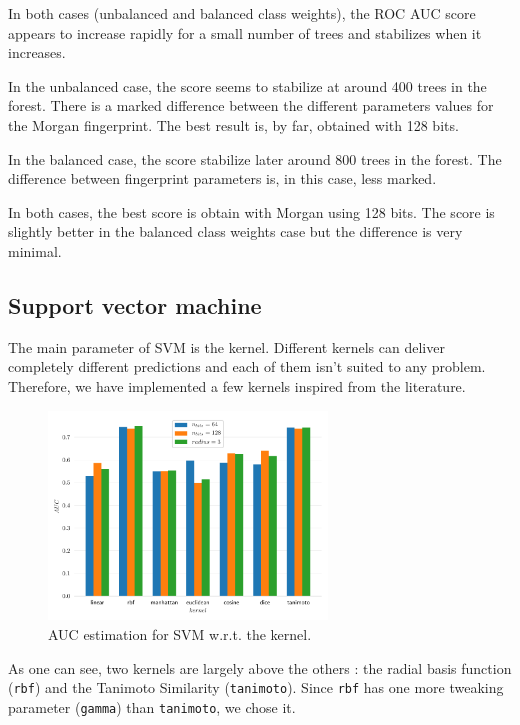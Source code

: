 In both cases (unbalanced and balanced class weights), the ROC AUC score appears to increase rapidly for a small number of trees and stabilizes when it increases.

In the unbalanced case, the score seems to stabilize at around 400 trees in the forest. There is a marked difference between the different parameters values for the Morgan fingerprint. The best result is, by far, obtained with 128 bits.

In the balanced case, the score stabilize later around 800 trees in the forest. The difference between fingerprint parameters is, in this case, less marked.

In both cases, the best score is obtain with Morgan using 128 bits. The score is slightly better in the balanced class weights case but the difference is very minimal.

\subsection{Support vector machine}

The main parameter of SVM is the kernel. Different kernels can deliver completely different predictions and each of them isn't suited to any problem. Therefore, we have implemented a few kernels inspired from the literature.

\begin{figure}[h]
    \centering
    \includegraphics[width=0.66\textwidth]{resources/pdf/svm-kernels.pdf}
    \caption{AUC estimation for SVM w.r.t. the kernel.}
\end{figure}

As one can see, two kernels are largely above the others : the radial basis function (\texttt{rbf}) and the Tanimoto Similarity (\texttt{tanimoto}). Since \texttt{rbf} has one more tweaking parameter (\texttt{gamma}) than \texttt{tanimoto}, we chose it.

